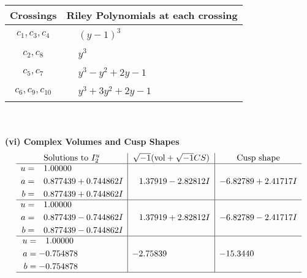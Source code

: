 \documentclass[1p]{elsarticle_modified}
\theoremstyle{definition}
\newcommand{\I}{\sqrt{-1}}
\begin{document}
\begin{tabular}{m{50pt}|m{274pt}}
Crossings & \hspace{64pt}Riley Polynomials at each crossing \\
\hline $$\begin{aligned}c_{1},c_{3},c_{4}\end{aligned}$$&$\begin{aligned}
&(y-1)^3
\end{aligned}$\\
\hline $$\begin{aligned}c_{2},c_{8}\end{aligned}$$&$\begin{aligned}
&y^3
\end{aligned}$\\
\hline $$\begin{aligned}c_{5},c_{7}\end{aligned}$$&$\begin{aligned}
&y^3- y^2+2 y-1
\end{aligned}$\\
\hline $$\begin{aligned}c_{6},c_{9},c_{10}\end{aligned}$$&$\begin{aligned}
&y^3+3 y^2+2 y-1
\end{aligned}$\\
\hline
\end{tabular}\\~\\
\newpage\flushleft \textbf{(vi) Complex Volumes and Cusp Shapes}
$$\begin{array}{c|c|c}  
\text{Solutions to }I^u_{2}& \I (\text{vol} + \sqrt{-1}CS) & \text{Cusp shape}\\
 \hline 
\begin{aligned}
u &= \phantom{-}1.00000\phantom{ +0.000000I} \\
a &= \phantom{-}0.877439 + 0.744862 I \\
b &= \phantom{-}0.877439 + 0.744862 I\end{aligned}
 & \phantom{-}1.37919 - 2.82812 I & -6.82789 + 2.41717 I \\ \hline\begin{aligned}
u &= \phantom{-}1.00000\phantom{ +0.000000I} \\
a &= \phantom{-}0.877439 - 0.744862 I \\
b &= \phantom{-}0.877439 - 0.744862 I\end{aligned}
 & \phantom{-}1.37919 + 2.82812 I & -6.82789 - 2.41717 I \\ \hline\begin{aligned}
u &= \phantom{-}1.00000\phantom{ +0.000000I} \\
a &= -0.754878\phantom{ +0.000000I} \\
b &= -0.754878\phantom{ +0.000000I}\end{aligned}
 & -2.75839\phantom{ +0.000000I} & -15.3440\phantom{ +0.000000I}\\
 \hline 
 \end{array}$$\newpage
\end{document}
